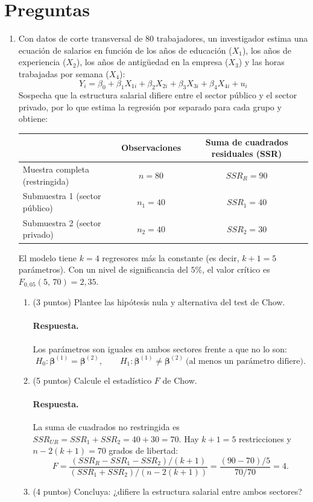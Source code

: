 \documentclass[letterpaper,11pt]{article}
\newcommand{\respuesta}{\color{blue}\paragraph{Respuesta.}}
\newcommand{\fin}{\color{black}}
\begin{document}
\section{Preguntas}
\begin{enumerate}
\item\color{black}  Con datos de corte transversal de 80 trabajadores, un investigador estima una ecuación de salarios en función de los años de educación ($X_1$), los años de experiencia ($X_2$), los años de antigüedad en la empresa ($X_3$) y las horas trabajadas por semana ($X_4$):
\[
Y_i = \beta_0 + \beta_1 X_{1i} + \beta_2 X_{2i} + \beta_3 X_{3i} + \beta_4 X_{4i} + u_i
\]
Sospecha que la estructura salarial difiere entre el sector público y el sector privado, por lo que estima la regresión por separado para cada grupo y obtiene:

\begin{center}
\begin{tabular}{lcc}
\hline
 & Observaciones & Suma de cuadrados residuales (SSR) \\
\hline
Muestra completa (restringida) & $n = 80$ & $SSR_R = 90$ \\
Submuestra 1 (sector público)  & $n_1 = 40$ & $SSR_1 = 40$ \\
Submuestra 2 (sector privado)  & $n_2 = 40$ & $SSR_2 = 30$ \\
\hline
\end{tabular}
\end{center}

El modelo tiene $k=4$ regresores más la constante (es decir, $k+1=5$ parámetros). Con un nivel de significancia del $5\%$, el valor crítico es $F_{0,05}(5,\,70) = 2{,}35$.

\begin{enumerate}[label=\alph*)]
    \item  (3 puntos) Plantee las hipótesis nula y alternativa del test de Chow.

    \respuesta Los parámetros son iguales en ambos sectores frente a que no lo son:
    \[
        H_0:\boldsymbol\beta^{(1)}=\boldsymbol\beta^{(2)},
        \qquad
        H_1:\boldsymbol\beta^{(1)}\neq\boldsymbol\beta^{(2)}
        \ \text{(al menos un parámetro difiere)}.
    \]
    \fin
    \item  (5 puntos) Calcule el estadístico $F$ de Chow.

    \respuesta La suma de cuadrados no restringida es
    $SSR_{UR}=SSR_1+SSR_2=40+30=70$. Hay $k+1=5$ restricciones y
    $n-2(k+1)=70$ grados de libertad:
    \[
        F=\frac{(SSR_R-SSR_1-SSR_2)/(k+1)}{(SSR_1+SSR_2)/(n-2(k+1))}
        =\frac{(90-70)/5}{70/70}=4.
    \]
    \fin
    \item  (4 puntos) Concluya: ¿difiere la estructura salarial entre ambos sectores?


\end{enumerate}
\end{enumerate}
\end{document}
